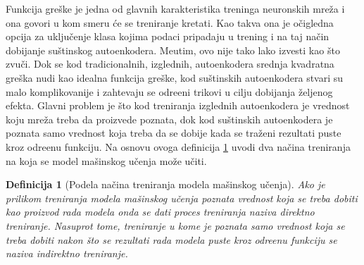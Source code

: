 \documentclass{article}
\newtheorem{definition}{Definicija}
\begin{document}
	Funkcija gre\v ske je jedna od glavnih karakteristika treninga neuronskih mre\v za i ona govori u kom smeru \'ce se treniranje kretati. 
	Kao takva ona je o\v cigledna opcija za uklju\v cenje klasa kojima podaci pripadaju u trening i na taj na\v cin dobijanje su\v stinskog autoenkodera. 
	Me\dj utim, ovo nije tako lako izvesti kao \v sto zvu\v ci. 
	Dok se kod tradicionalnih, izglednih, autoenkodera srednja kvadratna gre\v ska nudi kao idealna funkcija gre\v ske, kod su\v stinskih autoenkodera stvari su malo komplikovanije i zahtevaju se odre\dj eni trikovi u cilju dobijanja \v zeljenog efekta.
	Glavni problem je \v sto kod treniranja izglednih autoenkodera je vrednost koju mre\v za treba da proizvede poznata, dok kod su\v stinskih autoenkodera je poznata samo vrednost koja treba da se dobije kada se tra\v zeni rezultati puste kroz odre\dj enu funkciju.
	Na osnovu ovoga definicija \ref{types-of-machine-learning-training} uvodi dva na\v cina treniranja na koja se model ma\v sinskog u\v cenja mo\v ze u\v citi.
	
	\begin{definition}[Podela na\v cina treniranja modela ma\v sinskog u\v cenja]
		\label{types-of-machine-learning-training}
		Ako je prilikom treniranja modela ma\v sinskog u\v cenja poznata vrednost koja se treba dobiti kao proizvod rada modela onda se dati proces treniranja naziva \emph{direktno treniranje}. 
		Nasuprot tome, treniranje u kome je poznata samo vrednost koja se treba dobiti nakon \v sto se rezultati rada modela puste kroz odre\dj enu funkciju se naziva \emph{indirektno treniranje}.
	\end{definition}
\end{document}

